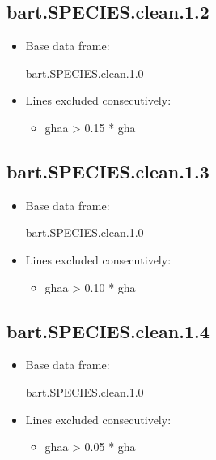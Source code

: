 \subsection{bart.SPECIES.clean.1.2}

\begin{itemize}
\item Base data frame: \begin{rcode} bart.SPECIES.clean.1.0 \end{rcode}
\item Lines excluded consecutively:
  \begin{itemize}
  \item \begin{rcode} ghaa > 0.15 * gha \end{rcode}
  \end{itemize}
\end{itemize}

\subsection{bart.SPECIES.clean.1.3}

\begin{itemize}
\item Base data frame: \begin{rcode} bart.SPECIES.clean.1.0 \end{rcode}
\item Lines excluded consecutively:
  \begin{itemize}
  \item \begin{rcode} ghaa > 0.10 * gha \end{rcode}
  \end{itemize}
\end{itemize}

\subsection{bart.SPECIES.clean.1.4}

\begin{itemize}
\item Base data frame: \begin{rcode} bart.SPECIES.clean.1.0 \end{rcode}
\item Lines excluded consecutively:
  \begin{itemize}
  \item \begin{rcode} ghaa > 0.05 * gha \end{rcode}
  \end{itemize}
\end{itemize}

